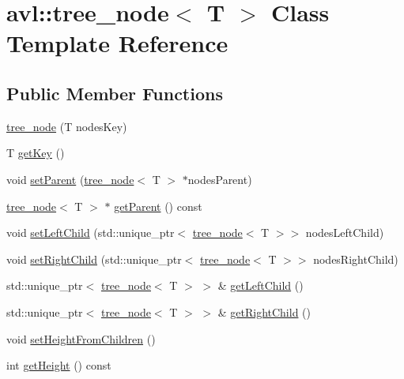 \hypertarget{classavl_1_1tree__node}{}\section{avl\+:\+:tree\+\_\+node$<$ T $>$ Class Template Reference}
\label{classavl_1_1tree__node}
\subsection*{Public Member Functions}
\begin{DoxyCompactItemize}
\item 
\hyperlink{classavl_1_1tree__node_a90f0d579eefbadcb32cb84bb798f1030}{tree\+\_\+node} (T nodes\+Key)
\item 
T \hyperlink{classavl_1_1tree__node_a27d17e38312d380b79da420bbc0da99d}{get\+Key} ()
\item 
void \hyperlink{classavl_1_1tree__node_abd5de5986ecb86e8a07b007a51d8cbec}{set\+Parent} (\hyperlink{classavl_1_1tree__node}{tree\+\_\+node}$<$ T $>$ $\ast$nodes\+Parent)
\item 
\hyperlink{classavl_1_1tree__node}{tree\+\_\+node}$<$ T $>$ $\ast$ \hyperlink{classavl_1_1tree__node_a3350faeaf03433fc236ffe811b41b04f}{get\+Parent} () const
\item 
void \hyperlink{classavl_1_1tree__node_acb0fbbc7cca1f2b18e72fb728be23979}{set\+Left\+Child} (std\+::unique\+\_\+ptr$<$ \hyperlink{classavl_1_1tree__node}{tree\+\_\+node}$<$ T $>$$>$ nodes\+Left\+Child)
\item 
void \hyperlink{classavl_1_1tree__node_a8b36f21d28a09858e32ba9f1b349994f}{set\+Right\+Child} (std\+::unique\+\_\+ptr$<$ \hyperlink{classavl_1_1tree__node}{tree\+\_\+node}$<$ T $>$$>$ nodes\+Right\+Child)
\item 
std\+::unique\+\_\+ptr$<$ \hyperlink{classavl_1_1tree__node}{tree\+\_\+node}$<$ T $>$ $>$ \& \hyperlink{classavl_1_1tree__node_ad12a5f6a41cfc6203913c5b6bce30837}{get\+Left\+Child} ()
\item 
std\+::unique\+\_\+ptr$<$ \hyperlink{classavl_1_1tree__node}{tree\+\_\+node}$<$ T $>$ $>$ \& \hyperlink{classavl_1_1tree__node_ac79592e64351573e622d0977002fc813}{get\+Right\+Child} ()
\item 
void \hyperlink{classavl_1_1tree__node_a5e3b8788433571c4b8462d2cf2d689b9}{set\+Height\+From\+Children} ()
\item 
int \hyperlink{classavl_1_1tree__node_ab298d8df03ff6414ff7280bbdbb16e8a}{get\+Height} () const
\item 

\end{DoxyCompactItemize}
